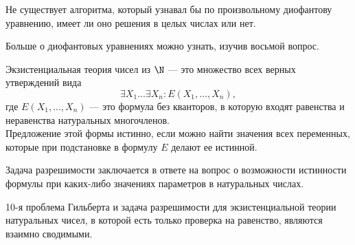     
    \begin{Thm}
        Не существует алгоритма, который узнавал бы по произвольному диофантову уравнению, имеет ли оно решения в целых числах или нет.
    \end{Thm}
    
    \begin{Rem}
        Больше о диофантовых уравнениях можно узнать, изучив восьмой вопрос.
    \end{Rem}

    
    \begin{Def}
        Экзистенциальная теория чисел из $\N$ --- это множество всех верных утверждений вида 
        $$\exists X_{1} ... \exists X_{n} : E(X_{1}, ..., X_{n}),$$ где $E(X_{1}, ..., X_{n})$ --- это формула без кванторов, в которую входят равенства и неравенства натуральных многочленов.\\
        Предложение этой формы истинно, если можно найти значения всех переменных, которые при подстановке в формулу $E$ делают ее истинной.
    \end{Def}
    
    \begin{Def}
        Задача разрешимости заключается в ответе на вопрос о возможности истинности формулы при каких-либо значениях параметров в натуральных числах.
    \end{Def}
    
    \begin{Thm}
        10-я проблема Гильберта и задача разрешимости для экзистенциальной теории натуральных чисел, в которой есть только проверка на равенство, являются взаимно сводимыми.
    \end{Thm}
    
